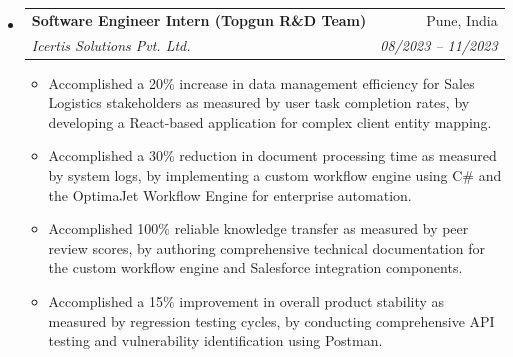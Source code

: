 \documentclass[a4paper,10pt]{article}
\makeatletter
\newcommand{\resumeItem}[1]{
  \item\small{#1}
}
\newcommand{\resumeItemListStart}{\begin{itemize}[leftmargin=0.2in]}
\newcommand{\resumeItemListEnd}{\end{itemize}\vspace{-5pt}}
\newcommand{\resumeSubheading}[4]{
  \vspace{-1pt}\item
    \begin{tabular*}{0.97\textwidth}[t]{l@{\extracolsep{\fill}}r}
      \textbf{#1} & #2 \\
      \textit{\small#3} & \textit{\small #4} \\
    \end{tabular*}\vspace{-5pt}
}
\makeatother
\begin{document}
\begin{itemize}[leftmargin=0.15in, label={}]
    \resumeSubheading
      {Software Engineer Intern (Topgun R\&D Team)}{Pune, India}
      {Icertis Solutions Pvt. Ltd.}{08/2023 -- 11/2023}
      \resumeItemListStart
        \resumeItem{Accomplished a 20\% increase in data management efficiency for Sales Logistics stakeholders as measured by user task completion rates, by developing a React-based application for complex client entity mapping.}
        \resumeItem{Accomplished a 30\% reduction in document processing time as measured by system logs, by implementing a custom workflow engine using C\# and the OptimaJet Workflow Engine for enterprise automation.}
        \resumeItem{Accomplished 100\% reliable knowledge transfer as measured by peer review scores, by authoring comprehensive technical documentation for the custom workflow engine and Salesforce integration components.}
        \resumeItem{Accomplished a 15\% improvement in overall product stability as measured by regression testing cycles, by conducting comprehensive API testing and vulnerability identification using Postman.}
      \resumeItemListEnd
\end{itemize}

\end{document}
